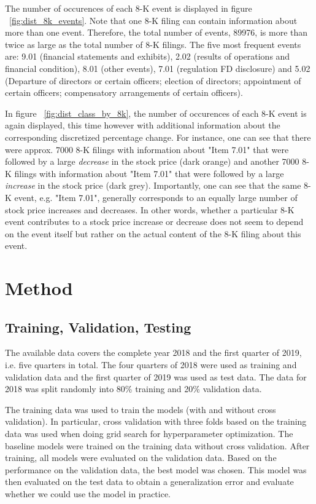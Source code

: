 \documentclass{article}
\begin{document}
	The number of occurences of each 8-K event is displayed in figure ~\ref{fig:dist_8k_events}. Note that one 8-K filing can contain information about more than one event. Therefore, the total number of events, 89976, is more than twice as large as the total number of 8-K filings. The five most frequent events are: 9.01 (financial statements and exhibits), 2.02 (results of operations and financial condition), 8.01 (other events), 7.01 (regulation FD disclosure) and 5.02 (Departure of directors or certain officers; election of directors; appointment of certain officers; compensatory arrangements of certain officers).
	
		
	In figure ~\ref{fig:dist_class_by_8k}, the number of occurences of each 8-K event is again displayed, this time however with additional information about the corresponding discretized percentage change. For instance, one can see that there were approx. 7000 8-K filings with information about "Item 7.01" that were followed by a large \textit{decrease} in the stock price (dark orange) and another 7000 8-K filings with information about "Item 7.01" that were followed by a large \textit{increase} in the stock price (dark grey). Importantly, one can see that the same 8-K event, e.g. "Item 7.01", generally corresponds to an equally large number of stock price increases and decreases. In other words, whether a particular 8-K event contributes to a stock price increase or decrease does not seem to depend on the event itself but rather on the actual content of the 8-K filing about this event.



	\section{Method}
	
	\subsection{Training, Validation, Testing}
	
	The available data covers the complete year 2018 and the first quarter of 2019, i.e. five quarters in total. The four quarters of 2018 were used as training and validation data and the first quarter of 2019 was used as test data. The data for 2018 was split randomly into 80\% training and 20\% validation data. 
	
	The training data was used to train the models (with and without cross validation). In particular, cross validation with three folds based on the training data was used when doing grid search for hyperparameter optimization. The baseline models were trained on the training data without cross validation. After training, all models were evaluated on the validation data. Based on the performance on the validation data, the best model was chosen. This model was then evaluated on the test data to obtain a generalization error and evaluate whether we could use the model in practice. 
	
\end{document}
